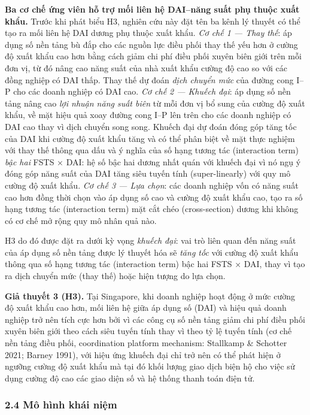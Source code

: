 \documentclass[12pt,a4paper]{article}
\begin{document}
\textbf{Ba cơ chế ứng viên hỗ trợ mối liên hệ DAI--năng suất phụ thuộc
xuất khẩu.} Trước khi phát biểu H3, nghiên cứu này đặt tên ba kênh lý
thuyết có thể tạo ra mối liên hệ DAI dương phụ thuộc xuất khẩu. \emph{Cơ
chế 1 --- Thay thế}: áp dụng số nền tảng bù đắp cho các nguồn lực điều
phối thay thế yếu hơn ở cường độ xuất khẩu cao hơn bằng cách giảm chi
phí điều phối xuyên biên giới trên mỗi đơn vị, từ đó nâng cao năng suất
của nhà xuất khẩu cường độ cao so với các đồng nghiệp có DAI thấp. Thay
thế dự đoán \emph{dịch chuyển mức} của đường cong I--P cho các doanh
nghiệp có DAI cao. \emph{Cơ chế 2 --- Khuếch đại}: áp dụng số nền tảng
nâng cao \emph{lợi nhuận năng suất biên} từ mỗi đơn vị bổ sung của cường
độ xuất khẩu, về mặt hiệu quả xoay đường cong I--P lên trên cho các
doanh nghiệp có DAI cao thay vì dịch chuyển song song. Khuếch đại dự
đoán đóng góp tăng tốc của DAI khi cường độ xuất khẩu tăng và có thể
phân biệt về mặt thực nghiệm với thay thế thông qua dấu và ý nghĩa của
số hạng tương tác (interaction term) \emph{bậc hai} FSTS × DAI: hệ số
bậc hai dương nhất quán với khuếch đại vì nó ngụ ý đóng góp năng suất
của DAI tăng siêu tuyến tính (super-linearly) với quy mô cường độ xuất
khẩu. \emph{Cơ chế 3 --- Lựa chọn}: các doanh nghiệp vốn có năng suất
cao hơn đồng thời chọn vào áp dụng số cao và cường độ xuất khẩu cao, tạo
ra số hạng tương tác (interaction term) mặt cắt chéo (cross-section)
dương khi không có cơ chế mở rộng quy mô nhân quả nào.

H3 do đó được đặt ra dưới kỳ vọng \emph{khuếch đại}: vai trò liên quan
đến năng suất của áp dụng số nền tảng được lý thuyết hóa sẽ \emph{tăng
tốc} với cường độ xuất khẩu thông qua số hạng tương tác (interaction
term) bậc hai FSTS × DAI, thay vì tạo ra dịch chuyển mức (thay thế) hoặc
hiện tượng do lựa chọn.

\textbf{Giả thuyết 3 (H3).} Tại Singapore, khi doanh nghiệp hoạt động ở
mức cường độ xuất khẩu cao hơn, mối liên hệ giữa áp dụng số (DAI) và
hiệu quả doanh nghiệp trở nên tích cực hơn bởi vì các công cụ số nền
tảng giảm chi phí điều phối xuyên biên giới theo cách siêu tuyến tính
thay vì theo tỷ lệ tuyến tính (cơ chế nền tảng điều phối, coordination
platform mechanism: Stallkamp \& Schotter 2021; Barney 1991), với hiệu
ứng khuếch đại chỉ trở nên có thể phát hiện ở ngưỡng cường độ xuất khẩu
mà tại đó khối lượng giao dịch biện hộ cho việc sử dụng cường độ cao các
giao diện số và hệ thống thanh toán điện tử.

\hypertarget{24-muxf4-huxecnh-khuxe1i-niux1ec7m}{%
\subsubsection{2.4 Mô hình khái
niệm}\label{24-muxf4-huxecnh-khuxe1i-niux1ec7m}}
\end{document}
